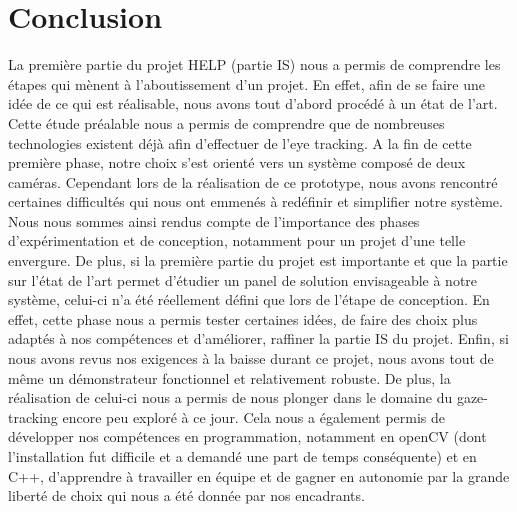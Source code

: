 \section*{Conclusion}

La première partie du projet HELP (partie IS) nous a permis de comprendre les étapes qui mènent à l’aboutissement d’un projet. En effet, afin de se faire une idée de ce qui est réalisable, nous avons tout d’abord procédé à un état de l’art. Cette étude préalable nous a permis de comprendre que de nombreuses technologies existent déjà afin d’effectuer de l’eye tracking. A la fin de cette première phase, notre choix s’est orienté vers un système composé de deux caméras. Cependant lors de la réalisation de ce prototype, nous avons rencontré certaines difficultés qui nous ont emmenés à redéfinir et simplifier notre système. Nous nous sommes ainsi rendus compte de l’importance des phases d’expérimentation et de conception, notamment pour un projet d’une telle envergure. 
\bigbreak
De plus, si la première partie du projet est importante et que la partie sur l’état de l’art permet d’étudier un panel de solution envisageable à notre système, celui-ci n’a été réellement défini que lors de l'étape de conception. En effet, cette phase nous a permis tester certaines idées, de faire des choix plus adaptés à nos compétences et d’améliorer, raffiner la partie IS du projet.
\bigbreak
Enfin, si nous avons revus nos exigences à la baisse durant ce projet, nous avons tout de même un démonstrateur fonctionnel et relativement robuste. De plus, la réalisation de celui-ci nous a permis de nous plonger dans le domaine du gaze-tracking encore peu exploré à ce jour. Cela nous a également permis de développer nos compétences en programmation, notamment en openCV (dont l'installation fut difficile et a demandé une part de temps conséquente) et en C++, d'apprendre à travailler en équipe et de gagner en autonomie par la grande liberté de choix qui nous a été donnée par nos encadrants. 

